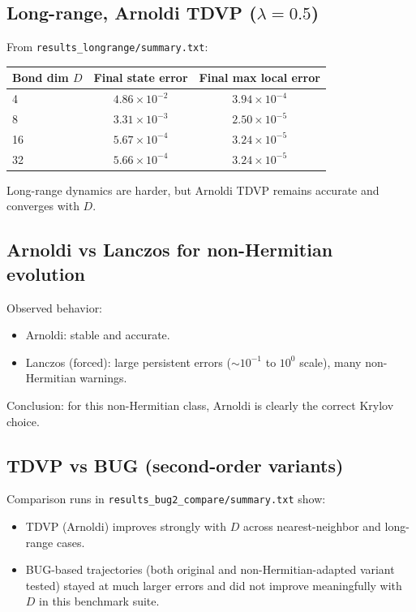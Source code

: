 \documentclass[11pt]{article}
\begin{document}
\subsection{Long-range, Arnoldi TDVP (\(\lambda=0.5\))}
From \texttt{results\_longrange/summary.txt}:
\begin{center}
\begin{tabular}{@{}lcc@{}}
\toprule
Bond dim \(D\) & Final state error & Final max local error \\
\midrule
4  & \(4.86\times 10^{-2}\) & \(3.94\times 10^{-4}\) \\
8  & \(3.31\times 10^{-3}\) & \(2.50\times 10^{-5}\) \\
16 & \(5.67\times 10^{-4}\) & \(3.24\times 10^{-5}\) \\
32 & \(5.66\times 10^{-4}\) & \(3.24\times 10^{-5}\) \\
\bottomrule
\end{tabular}
\end{center}
Long-range dynamics are harder, but Arnoldi TDVP remains accurate and converges with \(D\).

\subsection{Arnoldi vs Lanczos for non-Hermitian evolution}
Observed behavior:
\begin{itemize}
  \item Arnoldi: stable and accurate.
  \item Lanczos (forced): large persistent errors (\(\sim 10^{-1}\) to \(10^{0}\) scale), many non-Hermitian warnings.
\end{itemize}
Conclusion: for this non-Hermitian class, Arnoldi is clearly the correct Krylov choice.

\subsection{TDVP vs BUG (second-order variants)}
Comparison runs in \texttt{results\_bug2\_compare/summary.txt} show:
\begin{itemize}
  \item TDVP (Arnoldi) improves strongly with \(D\) across nearest-neighbor and long-range cases.
  \item BUG-based trajectories (both original and non-Hermitian-adapted variant tested) stayed at much larger errors and did not improve meaningfully with \(D\) in this benchmark suite.
\end{itemize}
\end{document}

